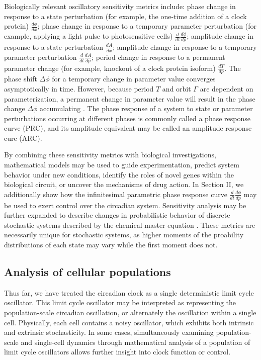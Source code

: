 Biologically relevant oscillatory sensitivity metrics include: phase change in response to a state perturbation (for example, the one-time addition of a clock protein) $\frac{d\phi}{dx}$; phase change in response to a temporary parameter perturbation (for example, applying a light pulse to photosensitive cells) $\frac{d}{dt}\frac{d\phi}{dp}$; amplitude change in response to a state perturbation $\frac{dA}{dx}$; amplitude change in response to a temporary parameter perturbation $\frac{d}{dt}\frac{dA}{dp}$; period change in response to a permanent parameter change (for example, knockout of a clock protein isoform) $\frac{dT}{dp}$.
The phase shift $\Delta\phi$ for a temporary change in parameter value converges asymptotically in time.
However, because period $T$ and orbit $\Gamma$ are dependent on parameterization, a permanent change in parameter value will result in the phase change $\Delta\phi$ accumulating \cite{Taylor2008a, Tidor2009}.
The phase response of a system to state or parameter perturbations occurring at different phases is commonly called a phase response curve (PRC), and its amplitude equivalent may be called an amplitude response cure (ARC).

By combining these sensitivity metrics with biological investigations, mathematical models may be used to guide experimentation, predict system behavior under new conditions, identify the roles of novel genes within the biological circuit, or uncover the mechanisms of drug action.
In Section II, we additionally show how the infinitesimal parametric phase response curve $\frac{d}{dt}\frac{d\phi}{dp}$ may be used to exert control over the circadian system.
Sensitivity analysis may be further expanded to describe changes in probabilistic behavior of discrete stochastic systems described by the chemical master equation \cite{Gunawan2005}.
These metrics are necessarily unique for stochastic systems, as higher moments of the proability distributions of each state may vary while the first moment does not.





\subsection*{Analysis of cellular populations\label{sec:33}}
Thus far, we have treated the circadian clock as a single deterministic limit cycle oscillator.
This limit cycle oscillator may be interpreted as representing the population-scale circadian oscillation, or alternately the oscillation within a single cell.
Physically, each cell contains a noisy oscillator, which exhibits both intrinsic and extrinsic stochasticity.
In some cases, simultaneously examining population-scale and single-cell dynamics through mathematical analysis of a population of limit cycle oscillators allows further insight into clock function or control.

